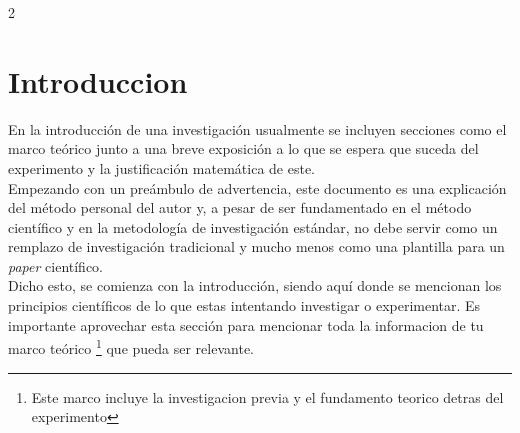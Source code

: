 \documentclass[12pt]{article}
\begin{document}
\begin{multicols}{2}

\section{Introduccion}

En la introducción de una investigación usualmente se incluyen secciones como el marco teórico junto a una breve exposición a lo que se espera que suceda del experimento y la justificación matemática de este.\\

Empezando con un preámbulo de advertencia, este documento es una explicación del método personal del autor y, a pesar de ser fundamentado en el método científico y en la metodología de investigación estándar, no debe servir como un remplazo de investigación tradicional y mucho menos como una plantilla para un \textit{paper} científico.\\

Dicho esto, se comienza con la introducción, siendo aquí donde se mencionan los principios científicos de lo que estas intentando investigar o experimentar. Es importante aprovechar esta sección para mencionar toda la informacion de tu marco teórico \footnote{Este marco incluye la investigacion previa y el fundamento teorico detras del experimento} que pueda ser relevante.


\end{multicols}
\end{document}
